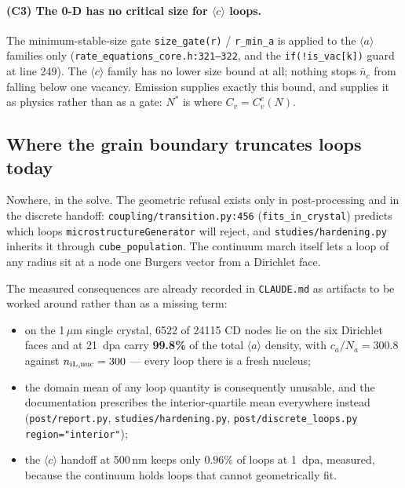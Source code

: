 \documentclass[11pt]{article}
\newcommand{\aloop}{\ensuremath{\langle a\rangle}}
\newcommand{\cloop}{\ensuremath{\langle c\rangle}}
\newcommand{\fbk}{\discretionary{}{}{}}   %
\newcommand{\file}[1]{\texttt{\small #1}}
\begin{document}
\paragraph{(C3) The 0-D has no critical size for \cloop{} loops.}
The minimum-stable-size gate \verb|size_gate(r)| / \verb|r_min_a| is applied
to the \aloop{} families only
(\file{rate\_\fbk equations\_\fbk core.\fbk h:321--322}, and the
\verb|if(!is_vac[k])| guard at line 249).  The \cloop{} family has no lower
size bound at all; nothing stops $\bar n_c$ from falling below one vacancy.
Emission supplies exactly this bound, and supplies it as physics rather than
as a gate: $N^{\ast}$ is where $C_v = C_v^{e}(N)$.

\subsection{Where the grain boundary truncates loops today}

Nowhere, in the solve.  The geometric refusal exists only in post-processing
and in the discrete handoff:
\file{coupling/\fbk transition.\fbk py:456} (\verb|fits_in_crystal|) predicts
which loops \verb|microstructureGenerator| will reject, and
\file{studies/\fbk hardening.\fbk py} inherits it through
\verb|cube_population|.  The continuum march itself lets a loop of any radius
sit at a node one Burgers vector from a Dirichlet face.

The measured consequences are already recorded in \file{CLAUDE.\fbk md} as
artifacts to be worked around rather than as a missing term:

\begin{itemize}
\item on the 1\,$\mu$m single crystal, 6522 of 24115 CD nodes lie on the six
  Dirichlet faces and at 21~dpa carry \textbf{99.8\%} of the total \aloop{}
  density, with $c_a/N_a = 300.8$ against $n_{\rm iL,nuc}=300$ --- every loop
  there is a fresh nucleus;
\item the domain mean of any loop quantity is consequently unusable, and the
  documentation prescribes the interior-quartile mean everywhere instead
  (\file{post/\fbk report.\fbk py}, \file{studies/\fbk hardening.\fbk py},
  \file{post/\fbk discrete\_\fbk loops.\fbk py} \verb|region="interior"|);
\item the \cloop{} handoff at 500\,nm keeps only $0.96\%$ of loops at 1~dpa,
  measured, because the continuum holds loops that cannot geometrically fit.
\end{itemize}
\end{document}
